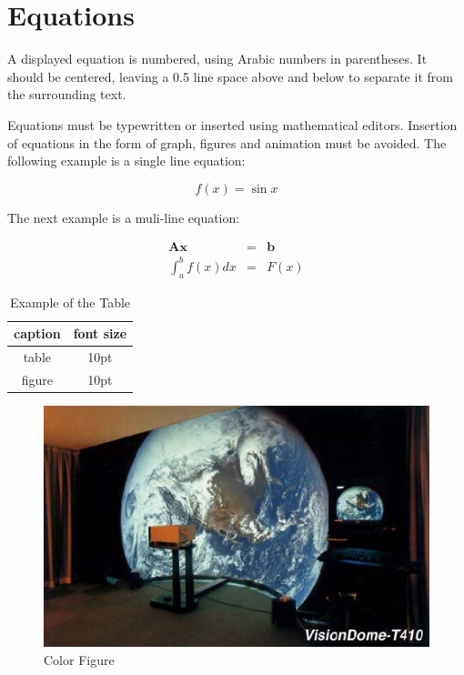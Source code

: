 \documentclass[english]{brccms-hu}
\begin{document}
\section{Equations}
A displayed equation is numbered, using Arabic 
numbers in parentheses. It should be centered, leaving 
a 0.5 line space above and below to separate it from 
the surrounding text.

Equations must be typewritten or inserted using 
mathematical editors. Insertion of equations in the 
form of graph, figures and animation must be avoided. 
The following example is a single line equation:

\begin{equation}
    f(x) = \sin x
\end{equation}

The next example is a muli-line equation:

\begin{eqnarray}
    \mathbf{A} \mathbf{x} &=& \mathbf{b}\\
    \int_a^b f(x)dx &=& F(x)
\end{eqnarray}

\begin{table}[htb]
\caption{Example of the Table}
\ecaption{}
\centering
\begin{tabular}{|c|c|}
\hline
caption & font size\\
\hline
table & 10pt\\
\hline
figure & 10pt\\
\hline
\end{tabular}
\end{table}

\begin{figure}[htb]
\centering
\includegraphics{fig1.jpg}
\caption{Color Figure}
\ecaption{}
\end{figure}
\end{document}
